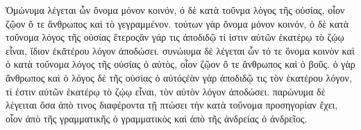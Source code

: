 

\newcommand{\anoteleia}{\raisebox{\dimexpr 1ex-\height\relax}{. }}


    Ὁμώνυμα λέγεται ὧν ὄνομα μόνον κοινόν, ό δὲ κατὰ τοὔνμα λὀγος τῆς οὐσίας, οἷον ζῷον ὅ τε ἄνθρωπος καὶ τὸ
    γεγραμμένον. τούτων γὰρ ὄνομα μόνον κοινόν, ὁ δὲ κατὰ τοὔνομα λόγος τῆς οὐσίας ἕτερος\anoteleia ἃν γάρ τις ἀποδιδῷ
    τί ἰστιν αὐτῶν ἑκατέρῳ τὸ ζῴῳ εἶναι, ἴδιον ἑκᾰτέρου λόγον ἀποδώσει. συνώιυμα δὲ λέγεται ὧν τό τε ὅνομα κοινὸν καὶ ὁ
    κατὰ τοὔνομα λόγος τῆς οὐσίας ὁ αὐτὸς, οἷον ζῷον ὅ τε ἄνθρωπος καὶ ὁ βοῦς. ὁ γὰρ ἄνθρωπος καὶ ὁ λόγος δὲ τῆς οὐσίας
    ὁ αὐτός\anoteleia ἐὰν γὰρ ἀποδιδῷ τις τὸν ἑκατέρου λόγον, τί ἐστιν αὐτῶν ἑκατέρῳ τὸ ζῴῳ εἶναι, τὸν αὐτὸν λόγον
    ἀποδώσει. παρώνυμα δὲ λέγειται ὅσα ἀπὸ τινος διαφέροντα τῇ πτώσει τὴν κατὰ τοὔνομα προσηγορίαν ἔχει, οἷον ἀπὸ τῆς
    γραμματικῆς ὁ γραμματικὸς καὶ ἀπὸ τῆς ἀνδρείας ὁ ἀνδρεῖος.

